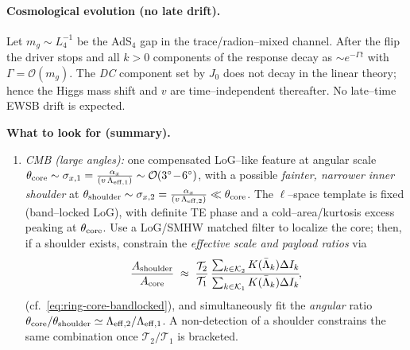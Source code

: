 \documentclass[10pt]{article}
\theoremstyle{definition}
\theoremstyle{plain}
\begin{document}
\paragraph{Cosmological evolution (no late drift).}\label{par:uom-main-170}
Let \(m_g\sim L_4^{-1}\) be the AdS\(_4\) gap in the trace/radion–mixed channel. After the flip the
driver stops and all \(k{>}0\) components of the response decay as
\(\sim e^{-\Gamma t}\) with \(\Gamma=\mathcal O(m_g)\). The \emph{DC} component set by \(J_0\) does not
decay in the linear theory; hence the Higgs mass shift and \(v\) are time–independent thereafter. No
late–time EWSB drift is expected.

\medskip
\noindent\textbf{What to look for (summary).}
\begin{enumerate}[leftmargin=2.1em,label=\Roman*. ,itemsep=2pt]
\item \emph{CMB (large angles):} one compensated LoG–like feature at angular scale
$\theta_{\rm core}\sim \sigma_{x,1}=\frac{\alpha_x}{(v\,\Lambda_{\rm eff,1})}\sim\mathcal O(3^\circ\!-\!6^\circ)$,
with a possible \emph{fainter, narrower inner shoulder} at
$\theta_{\rm shoulder}\sim \sigma_{x,2}=\frac{\alpha_x}{(v\,\Lambda_{\rm eff,2})}\ll \theta_{\rm core}$.
The $\ell$–space template is fixed (band–locked LoG), with definite TE phase and a cold–area/kurtosis excess
peaking at $\theta_{\rm core}$. Use a LoG/SMHW matched filter to localize the core; then, if a
shoulder exists, constrain the \emph{effective scale and payload ratios} via
\[
\frac{A_{\rm shoulder}}{A_{\rm core}}
\;\approx\;\frac{\mathcal T_{2}}{\mathcal T_{1}}\,
\frac{\sum_{k\in\mathcal K_2}K(\bar\Lambda_k)\Delta I_k}{\sum_{k\in\mathcal K_1}K(\bar\Lambda_k)\Delta I_k}\!,
\]
(cf.\ \eqref{eq:ring-core-bandlocked}), and simultaneously fit the \emph{angular} ratio
$\theta_{\rm core}/\theta_{\rm shoulder}\simeq \Lambda_{\rm eff,2}/\Lambda_{\rm eff,1}$. A non-detection of a shoulder
constrains the same combination once $\mathcal T_{2}/\mathcal T_{1}$ is bracketed.


\end{enumerate}
\end{document}
